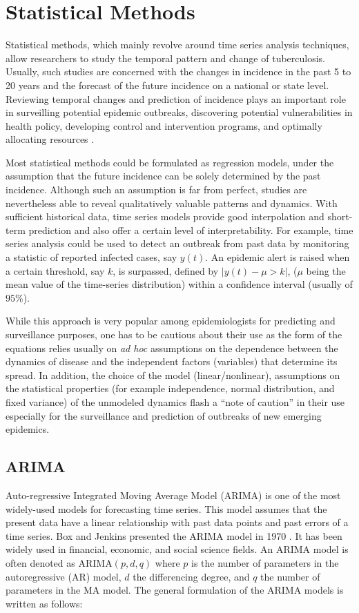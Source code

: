 \documentclass[8pt,twocolumn]{extarticle}
\newcommand{\arima}{\text{ARIMA}}
\begin{document}
\section{Statistical Methods}
Statistical methods, which mainly revolve around time series analysis techniques, allow researchers to study the temporal pattern and change of tuberculosis. Usually, such studies are concerned with the changes in incidence in the past 5 to 20 years and the forecast of the future incidence on a national or state level. Reviewing temporal changes and prediction of incidence plays an important role in surveilling potential epidemic outbreaks, discovering potential vulnerabilities in health policy, developing control and intervention programs, and optimally allocating resources \cite{Siettos2013}. 

Most statistical methods could be formulated as regression models, under the assumption that the future incidence can be solely determined by the past incidence. Although such an assumption is far from perfect, studies are nevertheless able to reveal qualitatively valuable patterns and dynamics. With sufficient historical data, time series models provide good interpolation and short-term prediction and also offer a certain level of interpretability. For example, time series analysis could be used to detect an outbreak from past data by monitoring a statistic of reported infected cases, say $y(t)$. An epidemic alert is raised when a certain threshold, say $k$, is surpassed, defined by $|y(t)-\mu > k|$, ($\mu$ being the mean value of the time-series distribution) within a confidence interval (usually of $95\%$).

While this approach is very popular among epidemiologists for predicting and surveillance purposes, one has to be cautious about their use as the form of the equations relies usually on \textit{ad hoc} assumptions on the dependence between the dynamics of disease and the independent factors (variables) that determine its spread. In addition, the choice of the model (linear/nonlinear), assumptions on the statistical properties (for example independence, normal distribution, and fixed variance) of the unmodeled dynamics flash a ``note of caution” in their use especially for the surveillance and prediction of outbreaks of new emerging epidemics.

\subsection{ARIMA}
Auto-regressive Integrated Moving Average Model (ARIMA) is one of the most widely-used models for forecasting time series. This model assumes that the present data have a linear relationship with past data points and past errors of a time series. Box and Jenkins presented the ARIMA model in 1970 \cite{Box1976}. It has been widely used in financial, economic, and social science fields. An ARIMA model is often denoted as $\arima(p,d,q)$ where $p$ is the number of parameters in the autoregressive (AR) model, $d$ the differencing degree, and $q$ the number of parameters in the MA model. The general formulation of the ARIMA models is written as follows: 
\end{document}
